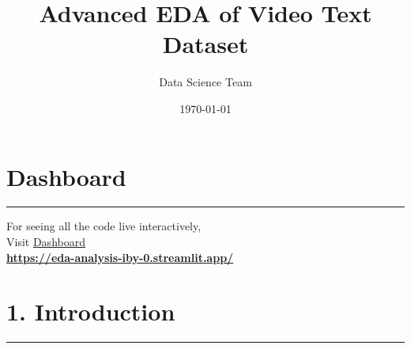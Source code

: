 \documentclass{article}
\title{\textcolor{primaryColor}{\Huge\textbf{Advanced EDA of Video Text Dataset}}}
\author{\textcolor{secondaryColor}{\Large Data Science Team}}
\date{\textcolor{secondaryColor}{\today}}
\begin{document}
\maketitle

\newpage
\section*{Dashboard}
  \begin{center}
        \color{red}\rule{1\linewidth}{1mm}
    \end{center}
\begin{center}
\vspace{2in}
    {\Huge  For seeing all the code live interactively, \\
    \vspace{2in}
    Visit  \href{https://eda-analysis-iby-0.streamlit.app/}{Dashboard}}\\
    
    \vspace{0.7in}
   \textbf{ \href{https://eda-analysis-iby-0.streamlit.app/}{https://eda-analysis-iby-0.streamlit.app/}}
\end{center}

\newpage
\tableofcontents

\newpage
\section{1. Introduction}
  \begin{center}
        \color{red}\rule{1\linewidth}{1mm}
    \end{center}
\end{document}
